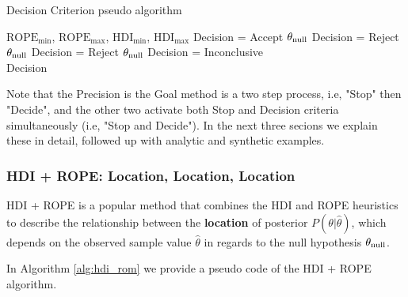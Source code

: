 \begin{algorithm}
    \caption{Decision Criterion pseudo algorithm}\label{alg:decision_criterion}
    \begin{algorithmic}
    \Require $\mathrm{ROPE}_\mathrm{min}$, $\mathrm{ROPE}_\mathrm{max}$, $\mathrm{HDI}_\mathrm{min}$, $\mathrm{HDI}_\mathrm{max}$
        \State Decision = Accept $\theta_{\rm null}$ 
        \State Decision = Reject $\theta_{\rm null}$ 
        \State Decision = Reject $\theta_{\rm null}$ 
    \Else
    \State Decision = Inconclusive  
    \EndIf \\
    \Return Decision
    \end{algorithmic} 
    
\end{algorithm}


Note that the Precision is the Goal method is a two step process, 
i.e, "Stop" then "Decide",
and the other two activate both Stop and Decision criteria simultaneously
(i.e, "Stop and Decide"). In the next three secions we explain these in detail,
followed up with analytic and synthetic examples.


\subsubsection{HDI + ROPE: Location, Location, Location}

HDI + ROPE is a popular method that combines the HDI and ROPE heuristics to describe
the relationship between the \textbf{location} of posterior $P(\theta|\hat\theta)$, which depends on the observed
sample value $\hat\theta$ in regards to the
null hypothesis $\theta_{\rm null}$.

In Algorithm \ref{alg:hdi_rom} we provide a pseudo code of the HDI + ROPE algorithm.

